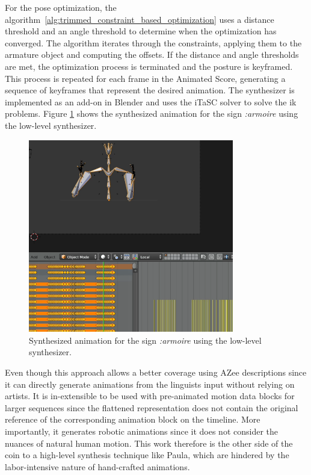 \documentclass[../../main.tex]{subfiles}
\begin{document}
For the pose optimization, the algorithm~\ref{alg:trimmed_constraint_based_optimization} uses a distance threshold and an angle threshold to determine when the optimization has converged. The algorithm iterates through the constraints, applying them to the armature object and computing the offsets. If the distance and angle thresholds are met, the optimization process is terminated and the posture is keyframed. This process is repeated for each frame in the Animated Score, generating a sequence of keyframes that represent the desired animation. The synthesizer is implemented as an add-on in Blender and uses the iTaSC solver to solve the \gls{ik} problems. Figure \ref{fig:armoire_low_level} shows the synthesized animation for the sign \emph{:armoire} using the low-level synthesizer.

\begin{figure}
  \centering
  \includegraphics[width=0.8\textwidth]{chapters/background_work/images/armoire_low_level.png}
  \caption{Synthesized animation for the sign \emph{:armoire} using the low-level synthesizer.}
  \label{fig:armoire_low_level}
\end{figure}

Even though this approach allows a better coverage using AZee descriptions since it can directly generate animations from the linguists input without relying on artists. It is in-extensible to be used with pre-animated motion data blocks for larger sequences since the flattened representation does not contain the original reference of the corresponding animation block on the timeline. More importantly, it generates robotic animations since it does not consider the nuances of natural human motion. This work therefore is the other side of the coin to a high-level synthesis technique like Paula, which are hindered by the labor-intensive nature of hand-crafted animations.
\end{document}
